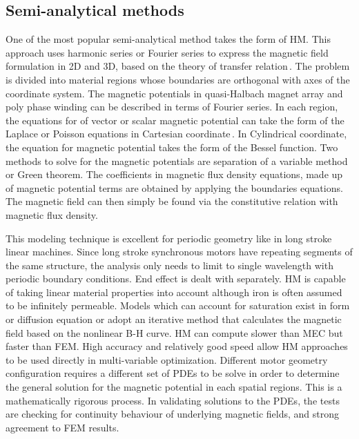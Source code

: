         
    \subsection{Semi-analytical methods}            \label{Chapter:background/modelling techniques for designing motors/semi-analytical methods}
    
    
        One of the most popular semi-analytical method takes the form of \ac{HM}. This approach uses harmonic series or Fourier series to express the magnetic field formulation in 2D and 3D, based on the theory of transfer relation\,\cite{Melcher1981ContinuumElectromechanics}. The problem is divided into material regions whose boundaries are orthogonal with axes of the coordinate system. The magnetic potentials in quasi-Halbach magnet array and poly phase winding can be described in terms of Fourier series. In each region, the equations for of vector or scalar magnetic potential can take the form of the Laplace or Poisson equations in Cartesian coordinate\,\cite{Trumper1993,Wang1999}. In Cylindrical coordinate, the equation for magnetic potential takes the form of the Bessel function\cite{Gysen2008AnalyticalFramework,Ruddy2011a,Gysen20113-DMagnets}. Two methods to solve for the magnetic potentials are separation of a variable method or Green theorem. The coefficients in magnetic flux density equations, made up of magnetic potential terms are obtained by applying the boundaries equations. The magnetic field can then simply be found via the constitutive relation with magnetic flux density.
        
        
        This modeling technique is excellent for periodic geometry like in long stroke linear machines. Since long stroke synchronous motors have repeating segments of the same structure, the analysis only needs to limit to single wavelength with periodic boundary conditions. End effect is dealt with separately. \acs{HM} is capable of taking linear material properties into account although iron is often assumed to be infinitely permeable. Models which can account for saturation exist in form or diffusion equation or adopt an iterative method that calculates the magnetic field based on the nonlinear B-H curve. \acs{HM} can compute slower than \acs{MEC} but faster than \acs{FEM}. High accuracy and relatively good speed allow HM approaches to be used directly in multi-variable optimization. Different motor geometry configuration requires a different set of \acsp{PDE} to be solve in order to determine the general solution for the magnetic potential in each spatial regions. This is a mathematically rigorous process. In validating solutions to the \acsp{PDE}, the tests are checking for continuity behaviour of underlying magnetic fields, and strong agreement to \acs{FEM} results.
        
